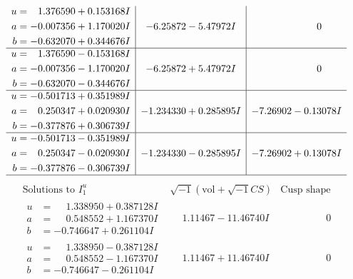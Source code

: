 \documentclass[1p]{elsarticle_modified}
\theoremstyle{definition}
\newcommand{\I}{\sqrt{-1}}
\begin{document}
$$\begin{array}{c|c|c}
\begin{aligned}
u &= \phantom{-}1.376590 + 0.153168 I \\
a &= -0.007356 + 1.170020 I \\
b &= -0.632070 + 0.344676 I\end{aligned}
 & -6.25872 - 5.47972 I & \phantom{-0.000000 } 0 \\ \hline\begin{aligned}
u &= \phantom{-}1.376590 - 0.153168 I \\
a &= -0.007356 - 1.170020 I \\
b &= -0.632070 - 0.344676 I\end{aligned}
 & -6.25872 + 5.47972 I & \phantom{-0.000000 } 0 \\ \hline\begin{aligned}
u &= -0.501713 + 0.351989 I \\
a &= \phantom{-}0.250347 + 0.020930 I \\
b &= -0.377876 + 0.306739 I\end{aligned}
 & -1.234330 + 0.285895 I & -7.26902 - 0.13078 I \\ \hline\begin{aligned}
u &= -0.501713 - 0.351989 I \\
a &= \phantom{-}0.250347 - 0.020930 I \\
b &= -0.377876 - 0.306739 I\end{aligned}
 & -1.234330 - 0.285895 I & -7.26902 + 0.13078 I\\
 \hline 
 \end{array}$$\newpage$$\begin{array}{c|c|c}  
\text{Solutions to }I^u_{1}& \I (\text{vol} + \sqrt{-1}CS) & \text{Cusp shape}\\
 \hline 
\begin{aligned}
u &= \phantom{-}1.338950 + 0.387128 I \\
a &= \phantom{-}0.548552 + 1.167370 I \\
b &= -0.746647 + 0.261104 I\end{aligned}
 & \phantom{-}1.11467 - 11.46740 I & \phantom{-0.000000 } 0 \\ \hline\begin{aligned}
u &= \phantom{-}1.338950 - 0.387128 I \\
a &= \phantom{-}0.548552 - 1.167370 I \\
b &= -0.746647 - 0.261104 I\end{aligned}
 & \phantom{-}1.11467 + 11.46740 I & \phantom{-0.000000 } 0 \\ \hline\begin{aligned}

\end{aligned}
\end{array}$$
\end{document}
